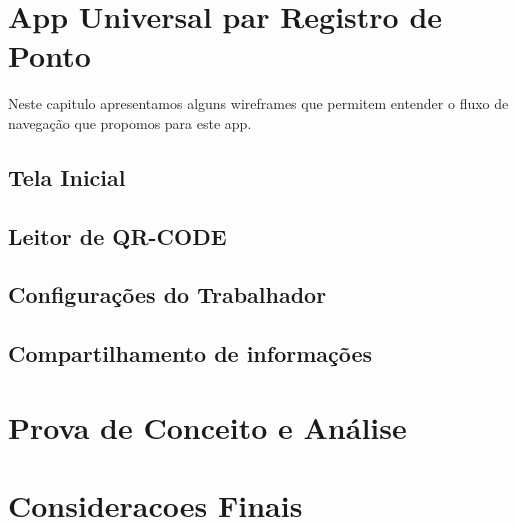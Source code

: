 \documentclass[12pt,openright,twoside,a4paper,english, brazil]{abntex2} %
\begin{document}
\chapter{App Universal par Registro de Ponto}


Neste capitulo apresentamos alguns wireframes que permitem entender o fluxo de navegação que propomos para este app.

\section{Tela Inicial}

\section{Leitor de QR-CODE}

\section{Configurações do Trabalhador}

\section{Compartilhamento de informações}

\chapter{Prova de Conceito e Análise}


\chapter{Consideracoes Finais}





\apendices
\end{document}
